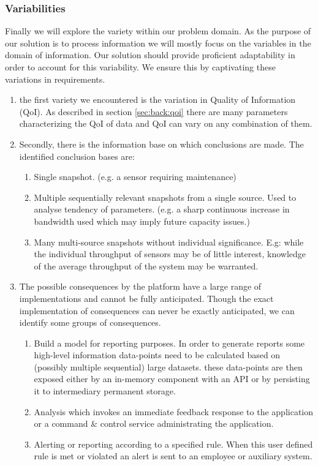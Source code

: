 \subsubsection*{Variabilities}
Finally we will explore the variety within our problem domain. As the purpose of our solution is to process information we will mostly focus on the variables in the domain of information. Our solution should provide proficient adaptability in order to account for this variability. We ensure this by captivating these variations in requirements.
\begin{enumerate}[label=V\archid .\arabic*]
\nospace
\item \label{v:qoi} the first variety we encountered is the variation in Quality of Information (QoI). As described in section \ref{sec:back:qoi} there are many parameters characterizing the QoI of data and QoI can vary on any combination of them.
\item \label{v:conclusion_basis} Secondly, there is the information base on which conclusions are made. The identified conclusion bases are:
\begin{enumerate}
\nospace
\item Single snapshot. (e.g. a sensor requiring maintenance)
\item Multiple sequentially relevant snapshots from a single source. Used to analyse tendency of parameters. (e.g. a sharp continuous increase in bandwidth used which may imply future capacity issues.)
\item Many multi-source snapshots without individual significance. E.g: while the individual throughput of sensors may be of little interest, knowledge of the average throughput of the system may be warranted.
\end{enumerate}
\item \label{v:consequence} The possible consequences by the platform have a large range of implementations and cannot be fully anticipated. Though the exact implementation of consequences can never be exactly anticipated, we can identify some groups of consequences.
\begin{enumerate}
\nospace
\item Build a model for reporting purposes. In order to generate reports some high-level information data-points need to be calculated based on (possibly multiple sequential) large datasets. these data-points are then exposed either by an in-memory component with an API or by persisting it to intermediary permanent storage.
\item Analysis which invokes an immediate feedback response to the application or a command \& control service administrating the application.
\item Alerting or reporting according to a specified rule. When this user defined rule is met or violated an alert is sent to an employee or auxiliary system.
\end{enumerate}
\end{enumerate}
